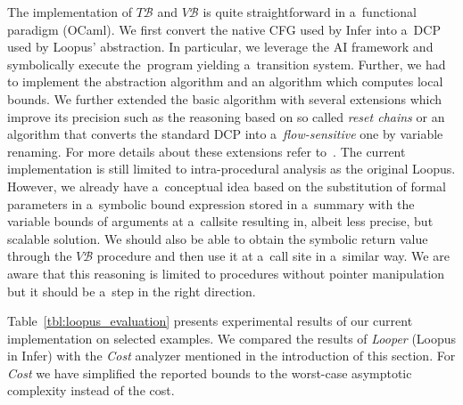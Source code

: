 \documentclass{ExcelAtFIT}
\begin{document}
The implementation of $T\mathcal{B}$ and 
$V\mathcal{B}$ is quite straightforward in 
a~functional paradigm (OCaml). We first convert
the native CFG used by Infer into a~DCP used
by Loopus' abstraction. In particular, we
leverage the AI framework and symbolically 
execute the~program yielding a~transition system.
Further, we had to implement the abstraction 
algorithm and an algorithm which computes local
bounds. We further extended the basic algorithm
with several extensions which improve its precision 
such as the reasoning based on so called 
\textit{reset chains} or an algorithm that converts
the standard DCP into a~\textit{flow-sensitive} one 
by variable renaming. For more details about these
extensions refer to~\cite{loopus-tool}. The current
implementation is still limited to intra-procedural
analysis as the original Loopus. However, we already
have a~conceptual idea based on the substitution of
formal parameters in a~symbolic bound expression stored
in a~summary with the variable bounds of arguments at 
a~callsite resulting in, albeit less precise, but 
scalable solution. We should also be able to obtain
the symbolic return value through the $V\mathcal{B}$
procedure and then use it at a~call site in a~similar
way. We are aware that this reasoning is limited to 
procedures without pointer manipulation but it should
be a~step in the right direction.

Table~\ref{tbl:loopus_evaluation} presents experimental
results of our current implementation on selected
examples. We compared the results of \textit{Looper}
(Loopus in Infer) with the \textit{Cost} analyzer
mentioned in the introduction of this section.
For \textit{Cost} we have simplified the reported
bounds to the worst-case asymptotic complexity
instead of the cost.

\newcommand{\bad}[1]{\textcolor{red}{\textbf{#1}}}
\newcommand{\good}[1]{\textcolor{darkgreen}{\textbf{#1}}}
\end{document}
